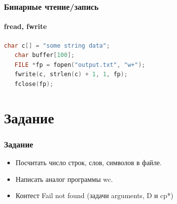 \documentclass[12pt,pdf,hyperref={unicode}]{beamer}
\begin{document}
\begin{frame}[fragile]
\frametitle{Бинарные чтение/запись}  
\framesubtitle{fread, fwrite}  
\begin{lstlisting}[language=C++,basicstyle=\ttfamily,keywordstyle=\color{blue},stringstyle=\color{orange}\ttfamily]
   char c[] = "some string data";
   char buffer[100];
   FILE *fp = fopen("output.txt", "w+");
   fwrite(c, strlen(c) + 1, 1, fp);
   fclose(fp);
\end{lstlisting}
\end{frame}





\section{Задание}

\begin{frame}[fragile]
\frametitle{Задание} 
\begin{itemize}
\item Посчитать число строк, слов, символов в файле.
\item Написать аналог программы wc.
\item Контест Fail not found (задачи arguments, D и cp*)
\end{itemize}
\end{frame}
\end{document}
